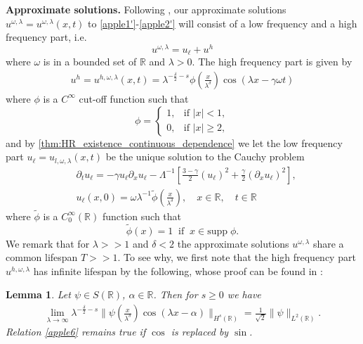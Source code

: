 \documentclass[12pt,reqno]{amsart}
\newcommand{\rr}{\mathbb{R}}
\newcommand{\p}{\partial}
\theoremstyle{plain}  %
\newtheorem{lemma}{Lemma}
\theoremstyle{definition}
\begin{document}
{\bf  Approximate solutions.}
Following \cite{Himonas_2009_Non-uniform-dep}, our approximate solutions
\\ $u^{\omega, \lambda} = u^{\omega,
\lambda}(x,t)$ to \eqref{apple1'}-\eqref{apple2'} will
consist of a low frequency and a high frequency part,
i.e.
%
%
%
%
\begin{equation}
\label{apple1}
u^{\omega,\lambda} = u_\ell + u^h
\end{equation}
%
%
%
%
where $\omega$ is in a bounded set of $\rr$ and $\lambda > 0$. The high frequency part is given by 
%
%
%
%
\begin{equation}
\begin{split}
u^h = u^{h,\omega,\lambda}(x,t) =
\lambda^{-\frac{\delta}{2} -s}
\phi \left (\frac{x}{\lambda^\delta}\right )
\cos(\lambda x - \gamma \omega t)
\end{split}
\end{equation}
%
%
%
%
where $\phi$ is a $C^\infty$ cut-off function such that
%
%
%
%
\begin{equation*}
\phi = \begin{cases}
1, &\text{if $|x|<1$,} \\
0, &\text{if $|x| \ge 2,$} \end{cases}
\end{equation*}
%
%
%
%
and by \autoref{thm:HR_existence_continuous_dependence} 
we let the low frequency part $u_\ell = u_{l,
\omega, \lambda}(x,t)$ be the unique solution to the Cauchy problem
%
%
\begin{align}
\label{u-l-apple1'}
& \p_t u_\ell = -\gamma u_\ell \p_x u_\ell -
\Lambda^{-1} \left[ \frac{3-\gamma}{2}(u_\ell)^2 +
\frac{\gamma}{2} \left( \p_x u_\ell \right)^2
\right],
\\
& u_\ell(x,0) = \omega \lambda^{-1} \tilde{\phi} \left(
\frac{x}{\lambda^{\delta}}
\right), \quad x \in \rr, \quad t \in \rr
\label{apple1**}
\end{align}
%
%
%
%
where $\tilde{\phi}$ is a $C^{\infty}_0(\rr)$ function such that
%
%
%
%
\begin{equation}
\label{apple1***}
\tilde{\phi}(x) = 1 \; \;  \text{if} \; \;
x \in \text{supp} \; \phi.
\end{equation}
%
%
%
%
We remark that for $\lambda >>1$ and $\delta < 2$ the approximate solutions 
$u^{\omega, \lambda}$ share a common lifespan $T >> 1$. To see why, we 
first note that the high frequency part $u^{h, \omega, \lambda}$ has 
infinite lifespan by the following, whose 
proof can be found in \cite{Himonas_2009_Non-uniform-dep}: 
%
%
\begin{lemma}
\label{applea}
Let $\psi \in S(\rr)$, $\alpha \in \rr$. Then for $s \ge 0$ we have
%
%
\begin{equation}
\begin{split}
\lim_{\lambda \to \infty} \lambda^{-\frac{\delta}{2}-s}
\|\psi \left( \frac{x}{\lambda^\delta} \right)\cos(\lambda
x - \alpha) \|_{H^s(\rr)} = \frac{1}{\sqrt
2}\|\psi\|_{L^2(\rr)}.
\label{apple6}
\end{split}
\end{equation}
%
%
Relation \eqref{apple6} remains true if $\cos$ is
replaced by $\sin$.
\end{lemma}
\end{document}
